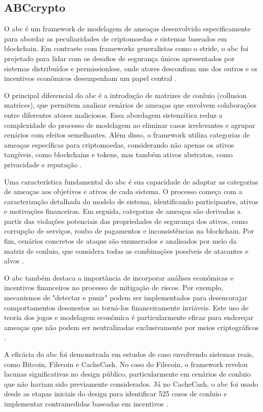 \subsection{ABCcrypto}
\label{subsec:abccrypto}

O \gls{abc} é um framework de modelagem de
ameaças desenvolvido especificamente para abordar as peculiaridades de
criptomoedas e sistemas baseados em blockchain. Em contraste com
frameworks generalistas como o \gls{stride}, o \gls{abc} foi projetado para lidar
com os desafios de segurança únicos apresentados por sistemas
distribuídos e permissionless, onde atores desconfiam uns dos outros e
os incentivos econômicos desempenham um papel central
\cite{AbcCrypto}.

O principal diferencial do \gls{abc} é a introdução de matrizes de conluio
(collusion matrices), que permitem analisar cenários de ameaças que
envolvem colaborações entre diferentes atores maliciosos. Essa
abordagem sistemática reduz a complexidade do processo de modelagem ao
eliminar casos irrelevantes e agrupar cenários com efeitos
semelhantes. Além disso, o framework utiliza categorias de ameaças
específicas para criptomoedas, considerando não apenas os ativos
tangíveis, como blockchains e tokens, mas também ativos abstratos,
como privacidade e reputação \cite{AbcCrypto}.

Uma característica fundamental do \gls{abc} é sua capacidade de adaptar as
categorias de ameaças aos objetivos e ativos de cada sistema. O
processo começa com a caracterização detalhada do modelo de sistema,
identificando participantes, ativos e motivações financeiras. Em
seguida, categorias de ameaças são derivadas a partir das violações
potenciais das propriedades de segurança dos ativos, como corrupção de
serviços, roubo de pagamentos e inconsistências na blockchain. Por
fim, cenários concretos de ataque são enumerados e analisados por meio
da matriz de conluio, que considera todas as combinações possíveis de
atacantes e alvos \cite{AbcCrypto}.

O \gls{abc} também destaca a importância de incorporar análises econômicas e
incentivos financeiros no processo de mitigação de riscos. Por
exemplo, mecanismos de "detectar e punir" podem ser implementados para
desencorajar comportamentos desonestos ao torná-los financeiramente
inviáveis. Este uso de teoria dos jogos e modelagem econômica é
particularmente eficaz para endereçar ameaças que não podem ser
neutralizadas exclusivamente por meios criptográficos
\cite{AbcCrypto}.

A eficácia do \gls{abc} foi demonstrada em estudos de caso envolvendo
sistemas reais, como Bitcoin, Filecoin e CacheCash. No caso do
Filecoin, o framework revelou lacunas significativas no design
público, particularmente em cenários de conluio que não haviam sido
previamente considerados. Já no CacheCash, o \gls{abc} foi usado desde as
etapas iniciais do design para identificar 525 casos de conluio e
implementar contramedidas baseadas em incentivos \cite{AbcCrypto}.


